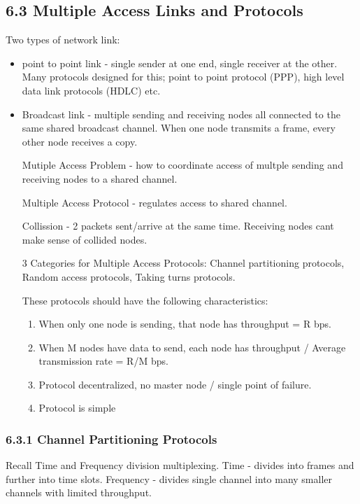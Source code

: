 \documentclass[11pt]{article}
\begin{document}
\subsection{6.3 Multiple Access Links and Protocols}
\label{sec:org928990e}
Two types of network link:
\begin{itemize}
\item point to point link - single sender at one end, single receiver at the other. Many protocols designed for this; point to point protocol (PPP), high level data link protocols (HDLC) etc.
\item Broadcast link - multiple sending and receiving nodes all connected to the same shared broadcast channel. When one node transmits a frame, every other node receives a copy.

Mutiple Access Problem - how to coordinate access of multple sending and receiving nodes to a shared channel.

Multiple Access Protocol - regulates access to shared channel.

Collission - 2 packets sent/arrive at the same time. Receiving nodes cant make sense of collided nodes.

3 Categories for Multiple Access Protocols: Channel partitioning protocols, Random access protocols, Taking turns protocols.

These protocols should have the following characteristics:
\begin{enumerate}
\item When only one node is sending, that node has throughput = R bps.

\item When M nodes have data to send, each node has throughput / Average transmission rate = R/M bps.

\item Protocol decentralized, no master node /  single point of failure.

\item Protocol is simple
\end{enumerate}
\end{itemize}

\subsubsection{6.3.1 Channel Partitioning Protocols}
\label{sec:org670f710}

Recall Time and Frequency division multiplexing. Time - divides into frames and further into time slots. Frequency - divides single channel into many smaller channels with limited throughput.
\end{document}
